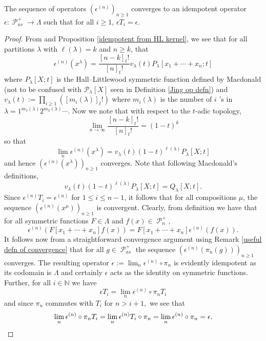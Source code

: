 \documentclass[ALCO,Unicode]{cedram}
\DeclareMathOperator{\sP}{\mathscr{P} }
\begin{document}
\begin{prop}\label{idempotents converge}
    The sequence of operators $(\epsilon^{(n)})_{n\geq 1}$ converges to an idempotent operator $\epsilon: \sP_{as}^{+} \rightarrow \Lambda$ such that for all $i \geq 1$, $\epsilon T_i = \epsilon$.
\end{prop}
\begin{proof}
    From \cite[Chapter 3, Section 2, (2.1), page 208]{Macdonald} and Proposition \ref{idempotent from HL kernel}, we see that for all partitions $\lambda$ with $\ell(\lambda) = k$ and $n \geq k$, that 
    \begin{equation}
        \epsilon^{(n)}(x^{\lambda}) = \frac{[n-k]_{t}!}{[n]_{t}!} v_{\lambda}(t) P_{\lambda}[x_1+\cdots + x_n;t]
    \end{equation}
where $P_{\lambda}[X;t]$ is the Hall--Littlewood symmetric function defined by Macdonald (not to be confused with $\mathcal{P}_{\lambda}[X]$ seen in Definition \ref{Jing op defn}) and 
$v_{\lambda}(t) := \prod_{i \geq 1}([m_i(\lambda)]_{t}!)$ where $m_i(\lambda)$ is the number of $i$
's in $\lambda = 1^{m_1(\lambda)}2^{m_2(\lambda)}\cdots$. Now we note that with respect to the $t$-adic topology,
$$\lim_{n \rightarrow \infty} \frac{[n-k]_{t}!}{[n]_{t}!} = (1-t)^k$$ so that 
$$ \lim_{n} \epsilon^{(n)}(x^{\lambda}) = v_{\lambda}(t)(1-t)^{\ell(\lambda)}P_{\lambda}[X;t] $$
and hence $(\epsilon^{(n)}(x^{\lambda}))_{n \geq 1}$ converges.
Note that following Macdonald's definitions, 
$$v_{\lambda}(t)(1-t)^{\ell(\lambda)}P_{\lambda}[X;t] = Q_{\lambda}[X;t].$$
Since $\epsilon^{(n)}T_i = \epsilon^{(n)}$ for $1\leq i \leq n-1$, it follows that for all compositions $\mu$, the sequence $(\epsilon^{(n)}(x^{\mu}))_{n \geq 1}$ is convergent. Clearly, from definition we have that for all symmetric functions $F \in \Lambda$ and $f(x) \in \sP_n^{+},$
$$\epsilon^{(n)}(F[x_1+ \cdots + x_n]f(x)) = F[x_1+ \cdots + x_n] \epsilon^{(n)}(f(x)).$$ It follows now from a straightforward convergence argument using Remark \ref{useful defn of convergence} that for all $g \in \sP_{as}^{+}$ the sequence $(\epsilon^{(n)}(\pi_n(g)))_{n\geq 1}$ converges. The resulting operator $\epsilon:= \lim_{n} \epsilon^{(n)}\circ \pi_n$ is evidently idempotent as its codomain is $\Lambda$ and certainly $\epsilon$ acts as the identity on symmetric functions. Further, for all $i \in \mathbb{N}$ we have  
$$ \epsilon T_i = \lim_{n} \epsilon^{(n)}\circ \pi_n T_i $$
and since $\pi_n$ commutes with $T_i$ for $n > i + 1,$ we see that 
\[\lim_{n} \epsilon^{(n)}\circ \pi_n T_i = \lim_{n} \epsilon^{(n)} T_i \circ \pi_n = \lim_{n} \epsilon^{(n)} \circ \pi_n  = \epsilon. \qedhere\]
\end{proof}
\end{document}
